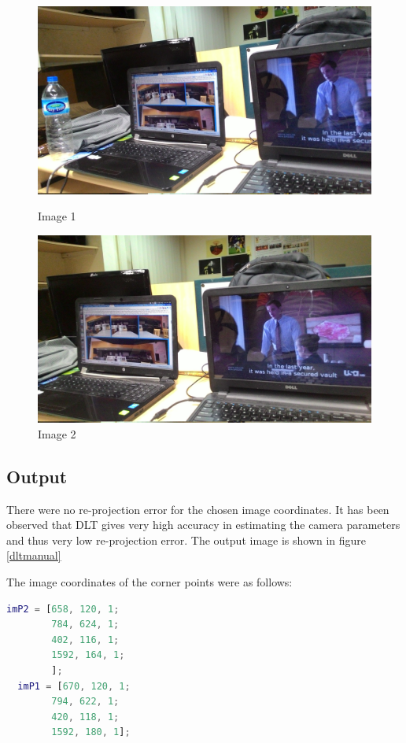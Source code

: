 \documentclass[12pt]{article}
\begin{document}
\begin{figure}[h]
\centering
\begin{minipage}{0.6\textwidth}
\centering
\includegraphics[scale = 0.067]{pt1.jpg}
\caption{Image 1}
\label{fig:Image 1}
\end{minipage}%
\begin{minipage}{.5\textwidth}
\centering
\includegraphics[scale = 0.067]{pt2.jpg}
\caption{Image 2}
\label{fig:Image 2}
\end{minipage}%
\end{figure}

\subsection{Output}
There were no re-projection error for the chosen image coordinates. It has been observed that DLT gives very high accuracy in estimating the camera parameters and thus very low re-projection error. The output image is shown in figure \ref{dltmanual}

The image coordinates of the corner points were as follows:
\begin{lstlisting}[language=matlab]
 imP2 = [658, 120, 1;
        784, 624, 1;
        402, 116, 1;
        1592, 164, 1;
        ];
  imP1 = [670, 120, 1;
        794, 622, 1;
        420, 118, 1;
        1592, 180, 1];
\end{lstlisting}
\end{document}

